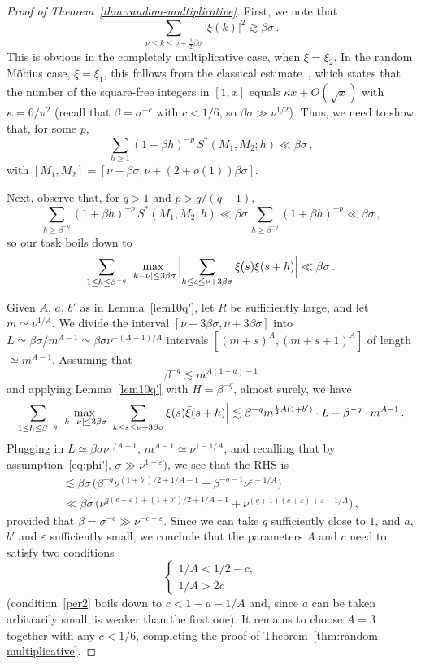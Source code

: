 \documentclass[11pt]{amsart}
\numberwithin{equation}{section}
\def\ep{{\varepsilon}}
\begin{document}
\begin{proof}[Proof of Theorem~\ref{thm:random-multiplicative}]
First, we note that
\[
\sum_{\nu \le k \le \nu + \frac12 \beta\sigma} |\xi (k)|^2 \gtrsim \beta\sigma\,.
\]
This is obvious in the completely multiplicative case, when $\xi=\xi_2$. In the random M\"obius case,
$\xi=\xi_1$, this follows from the classical estimate~\cite[Theorem~333]{HW},
which states that the number of the square-free integers in $[1, x]$ equals $\kappa x +O(\sqrt{x})$ with $\kappa=6/\pi^2$ (recall that $\beta=\sigma^{-c}$ with $c<1/6$, so $\beta\sigma \gg \nu^{1/2}$).
Thus, we need to show that, for some $p$,
\[
\sum_{h\ge 1} (1+\beta h)^{-p}\, S^*(M_1, M_2; h) \ll \beta\sigma\,,
\]
with $[M_1, M_2] = [\nu-\beta\sigma, \nu + (2+o(1))\beta\sigma]$.

Next, observe that, for $q>1$ and $p>q/(q-1)$,
\[
\sum_{h\ge \beta^{-q}} (1+\beta h)^{-p}\, S^*(M_1, M_2; h) \ll
\beta\sigma\, \sum_{h\ge \beta^{-q}} (1+\beta h)^{-p} \ll \beta\sigma\,,
\]
so our task boils down to
\[
\sum_{1 \le h \le \beta^{-q}} \,
\max_{|k-\nu|\le 3\beta\sigma}\,
\Bigl| \sum_{k\le s \le \nu +3\beta\sigma} \xi(s)\bar\xi(s+h) \Bigr|
\ll \beta\sigma\,.
\]

Given $A$, $a$, $b'$ as in Lemma~\ref{lem10q'}, let $R$ be sufficiently large, and let $m\simeq \nu^{1/A}$. We
divide the interval $[\nu-3\beta\sigma, \nu+3\beta\sigma]$
into $L\simeq \beta\sigma/m^{A-1} \simeq\beta\sigma \nu^{-(A-1)/A}$
intervals $[(m+s)^A, (m+s+1)^A]$ of length $\simeq m^{A-1}$.
Assuming that
\begin{equation}\label{per2}
\beta^{-q} \lesssim m^{A(1-a)-1}
\end{equation}
and applying Lemma~\ref{lem10q'} with $H=\beta^{-q}$,
almost surely, we have
\[
\sum_{1 \le h \le \beta^{-q}} \,
\max_{|k-\nu|\le 3\beta\sigma}\,
\Bigl| \sum_{k\le s \le \nu +3\beta\sigma} \xi(s)\bar\xi(s+h) \Bigr|
\lesssim \beta^{-q}m^{\frac12A(1+b')}\cdot L + \beta^{-q} \cdot m^{A-1}\,.
\]
Plugging in $L\simeq \beta\sigma \nu^{1/A-1}$,
$m^{A-1}\simeq \nu^{1-1/A}$, and recalling that by assumption~\eqref{eq:phi'},
$\sigma \gg \nu^{1-\ep})$, we see that the RHS is
\begin{multline*}
\lesssim \beta\sigma\, \bigl(\beta^{-q}\nu^{(1+b')/2 +1/A-1}
+ \beta^{-q-1}\nu^{\ep - 1/A} \bigr) \\
\ll \beta\sigma\, \bigl( \nu^{q(c+\ep) + (1+b')/2 +1/A -1} + \nu^{(q+1)(c+\ep) +\ep -1/A} \bigr)\,,
\end{multline*}
provided that $\beta = \sigma^{-c} \gg \nu^{-c-\ep}$.
Since we can take $q$ sufficiently close to $1$, and $a$, $b'$ and $\ep$ sufficiently small,
we conclude that the parameters $A$ and $c$ need to satisfy two conditions
\[
\begin{cases}
1/A < 1/2 - c, \\
1/A > 2c
\end{cases}
\]
(condition~\eqref{per2} boils down to $c<1-a-1/A$ and, since $a$ can be taken arbitrarily small,
is weaker than the first one). It remains to choose $A=3$ together with any $c<1/6$,
completing the proof of Theorem~\ref{thm:random-multiplicative}. 
\end{proof}
\end{document}
